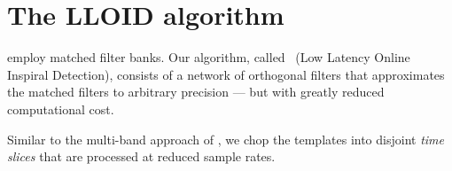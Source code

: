 \documentclass[portrait,plainboxedsections]{sciposter}
\begin{document}
\begin{minipage}[t]{0.4\textwidth}

\section*{The LLOID algorithm}

 employ matched
filter banks.
Our algorithm, called \lloid{}~(Low Latency Online Inspiral Detection),
consists of a network of orthogonal filters that approximates the matched filters to arbitrary
precision --- but with greatly reduced computational cost.

{
\setlength{\parindent}{1em}

Similar to the multi-band approach of \citet{Buskulic2010}, we chop the templates into
disjoint \emph{time slices} that are processed at reduced sample rates.

}
\end{minipage}
\end{document}
